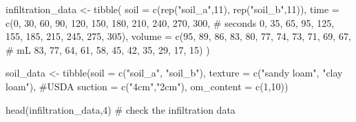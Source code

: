 \documentclass[
]{article}
\newenvironment{Shaded}{\begin{snugshade}}{\end{snugshade}}
\newcommand{\AttributeTok}[1]{\textcolor[rgb]{0.40,0.45,0.13}{#1}}
\newcommand{\CommentTok}[1]{\textcolor[rgb]{0.37,0.37,0.37}{#1}}
\newcommand{\DecValTok}[1]{\textcolor[rgb]{0.68,0.00,0.00}{#1}}
\newcommand{\FunctionTok}[1]{\textcolor[rgb]{0.28,0.35,0.67}{#1}}
\newcommand{\NormalTok}[1]{\textcolor[rgb]{0.00,0.23,0.31}{#1}}
\newcommand{\OtherTok}[1]{\textcolor[rgb]{0.00,0.23,0.31}{#1}}
\newcommand{\StringTok}[1]{\textcolor[rgb]{0.13,0.47,0.30}{#1}}
\begin{document}
\begin{Shaded}
\begin{Highlighting}[]
\NormalTok{infiltration\_data }\OtherTok{\textless{}{-}} \FunctionTok{tibble}\NormalTok{(}
  \AttributeTok{soil =} \FunctionTok{c}\NormalTok{(}\FunctionTok{rep}\NormalTok{(}\StringTok{"soil\_a"}\NormalTok{,}\DecValTok{11}\NormalTok{), }\FunctionTok{rep}\NormalTok{(}\StringTok{"soil\_b"}\NormalTok{,}\DecValTok{11}\NormalTok{)),}
  \AttributeTok{time =} \FunctionTok{c}\NormalTok{(}\DecValTok{0}\NormalTok{, }\DecValTok{30}\NormalTok{, }\DecValTok{60}\NormalTok{, }\DecValTok{90}\NormalTok{, }\DecValTok{120}\NormalTok{, }\DecValTok{150}\NormalTok{, }\DecValTok{180}\NormalTok{, }\DecValTok{210}\NormalTok{, }\DecValTok{240}\NormalTok{, }\DecValTok{270}\NormalTok{, }\DecValTok{300}\NormalTok{, }\CommentTok{\# seconds}
           \DecValTok{0}\NormalTok{, }\DecValTok{35}\NormalTok{, }\DecValTok{65}\NormalTok{, }\DecValTok{95}\NormalTok{, }\DecValTok{125}\NormalTok{, }\DecValTok{155}\NormalTok{, }\DecValTok{185}\NormalTok{, }\DecValTok{215}\NormalTok{, }\DecValTok{245}\NormalTok{, }\DecValTok{275}\NormalTok{, }\DecValTok{305}\NormalTok{),}
  \AttributeTok{volume =} \FunctionTok{c}\NormalTok{(}\DecValTok{95}\NormalTok{, }\DecValTok{89}\NormalTok{, }\DecValTok{86}\NormalTok{, }\DecValTok{83}\NormalTok{, }\DecValTok{80}\NormalTok{, }\DecValTok{77}\NormalTok{, }\DecValTok{74}\NormalTok{, }\DecValTok{73}\NormalTok{, }\DecValTok{71}\NormalTok{, }\DecValTok{69}\NormalTok{, }\DecValTok{67}\NormalTok{, }\CommentTok{\# mL}
             \DecValTok{83}\NormalTok{, }\DecValTok{77}\NormalTok{, }\DecValTok{64}\NormalTok{, }\DecValTok{61}\NormalTok{, }\DecValTok{58}\NormalTok{, }\DecValTok{45}\NormalTok{, }\DecValTok{42}\NormalTok{, }\DecValTok{35}\NormalTok{, }\DecValTok{29}\NormalTok{, }\DecValTok{17}\NormalTok{, }\DecValTok{15}\NormalTok{)}
\NormalTok{)}

\NormalTok{soil\_data }\OtherTok{\textless{}{-}} \FunctionTok{tibble}\NormalTok{(}\AttributeTok{soil =} \FunctionTok{c}\NormalTok{(}\StringTok{"soil\_a"}\NormalTok{, }\StringTok{"soil\_b"}\NormalTok{),}
                    \AttributeTok{texture =} \FunctionTok{c}\NormalTok{(}\StringTok{"sandy loam"}\NormalTok{, }\StringTok{"clay loam"}\NormalTok{), }\CommentTok{\#USDA}
                    \AttributeTok{suction =} \FunctionTok{c}\NormalTok{(}\StringTok{"4cm"}\NormalTok{,}\StringTok{"2cm"}\NormalTok{),}
                    \AttributeTok{om\_content =} \FunctionTok{c}\NormalTok{(}\DecValTok{1}\NormalTok{,}\DecValTok{10}\NormalTok{))}

\FunctionTok{head}\NormalTok{(infiltration\_data,}\DecValTok{4}\NormalTok{) }\CommentTok{\# check the infiltration data}
\end{Highlighting}
\end{Shaded}
\end{document}
